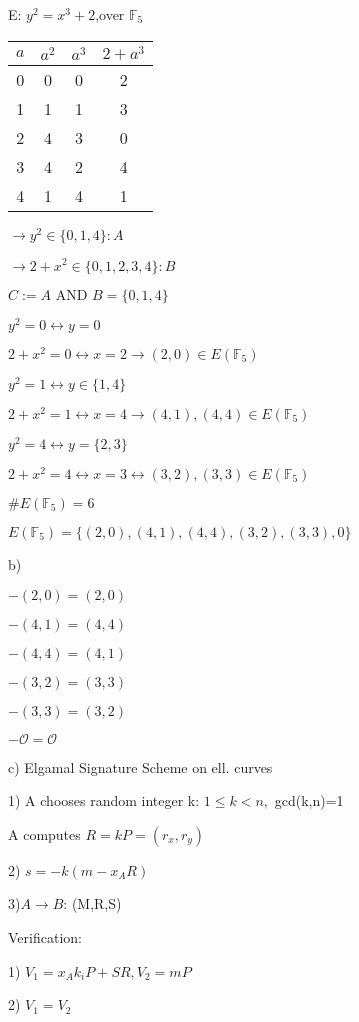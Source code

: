 \documentclass[a4paper]{article}
\begin{document}
E: $y^2=x^3+2$,over $\mathbb{F}_5$
\begin{table}[h]
	\centering
	\begin{tabular}{ccc|c}
	$a$ & $a^2$ & $a^3$ & $2+a^3$ \\
	\hline
	0 & 0& 0&2\\
	1&1&1&3\\
	2&4&3&0\\
	3&4&2&4\\
	4&1&4&1
	
	\end{tabular}
\end{table}

$\rightarrow y^2 \in \{0,1,4\}:A$

$\rightarrow 2+x^2 \in \{0,1,2,3,4\}:B$

$C:= A \text{ AND } B = \{0,1,4\}$



$y^2 = 0 \leftrightarrow y=0$

$2+x^2 = 0 \leftrightarrow x=2 \rightarrow (2,0) \in E(\mathbb{F}_5)$

$y^2 = 1 \leftrightarrow y \in \{1,4\}$

$2+x^2=1 \leftrightarrow x=4 \rightarrow (4,1),(4,4)\in E(\mathbb{F}_5)$

$y^2=4 \leftrightarrow y = \{2,3\}$

$2+x^2 = 4 \leftrightarrow x=3 \leftrightarrow (3,2),(3,3) \in E(\mathbb{F}_5)$

$\#E(\mathbb{F}_5)=6$

$E(\mathbb{F}_5)=\{(2,0),(4,1),(4,4),(3,2),(3,3),0\}$

b)

$-(2,0)=(2,0)$

$-(4,1)=(4,4)$

$-(4,4)=(4,1)$

$-(3,2)=(3,3)$

$-(3,3)=(3,2)$

$-\mathcal{O}=\mathcal{O}$


c)
Elgamal Signature Scheme on ell. curves

1) A chooses random integer k: $1\leq k < n,$ gcd(k,n)=1

A computes $R=kP=(r_x,r_y)$

2) $s=-k(m-x_AR)$

3)$A\rightarrow B$: (M,R,S)

Verification:

1) $V_1 = x_A k_i P + SR,V_2=mP$

2) $V_1 = V_2$
\end{document}
